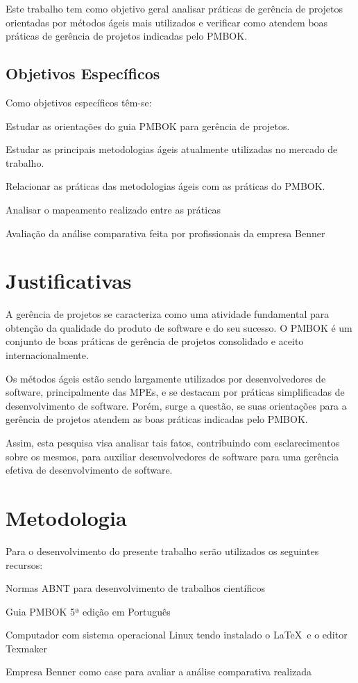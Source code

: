 \documentclass[
    12pt,               %
    openright,          %
    twoside,            %
    a4paper,            %
    chapter=TITLE,     %
    english,            %
    spanish,            %
    portuguese              %
    ]{abntex2}
\begin{document}
Este trabalho tem como objetivo geral analisar práticas de gerência de projetos orientadas por métodos ágeis mais utilizados e verificar como atendem boas práticas de gerência de projetos indicadas pelo PMBOK.

\subsection{Objetivos Específicos}
Como objetivos específicos têm-se:
\begin{alineas}
	\item Estudar as orientações do guia PMBOK para gerência de projetos.
	\item Estudar as principais metodologias ágeis atualmente utilizadas no mercado de trabalho.
	\item Relacionar as práticas das metodologias ágeis com as práticas do PMBOK.
	\item Analisar o mapeamento realizado entre as práticas
	\item Avaliação da análise comparativa feita por profissionais da empresa Benner
\end{alineas}

\section{Justificativas}

A gerência de projetos se caracteriza como uma atividade fundamental para obtenção da qualidade do produto de software e do seu sucesso. O PMBOK é um conjunto de boas práticas de gerência de projetos consolidado e aceito internacionalmente.

Os métodos ágeis estão sendo largamente utilizados por desenvolvedores de software, principalmente das MPEs, e se destacam por práticas simplificadas de desenvolvimento de software. Porém, surge a questão, se suas orientações para a gerência de projetos atendem as boas práticas indicadas pelo PMBOK.

Assim, esta pesquisa visa analisar tais fatos, contribuindo com esclarecimentos sobre os mesmos, para auxiliar desenvolvedores de software para uma gerência efetiva de desenvolvimento de software.


\section{Metodologia}

Para o desenvolvimento do presente trabalho serão utilizados os seguintes recursos:
\begin{alineas}
	\item Normas ABNT para desenvolvimento de trabalhos científicos
	\item Guia PMBOK 5ª edição em Português
	\item Computador com sistema operacional Linux tendo instalado o \LaTeX \ e o editor Texmaker
	\item Empresa Benner como case para avaliar a análise comparativa realizada
\end{alineas}
\end{document}

